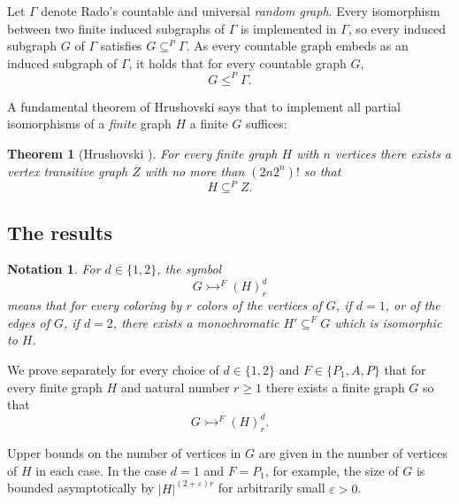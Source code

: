 \documentclass[11pt]{amsart}
\newcommand{\ars}{\rightarrowtail}
\newcommand{\su}{\subseteq}
\newtheorem*{notation}{Notation}
\newtheorem{theorem}{Theorem}[section]
\begin{document}
Let $\Gamma$ denote Rado's countable and universal \emph{random
  graph}. Every isomorphism between two finite induced subgraphs of
$\Gamma$ is implemented in $\Gamma$, so every induced subgraph
$G$
of $\Gamma$ satisfies $G\su ^P \Gamma$. As every
countable graph embeds as an induced subgraph of $\Gamma$,
it holds that for every countable graph $G$,
\begin{equation}G\le ^P \Gamma.
\end{equation}



A fundamental theorem of Hrushovski \cite{H} says  that to implement
all
partial isomorphisms of a \emph{finite} graph $H$  a finite $G$
suffices:

\begin{theorem}[Hrushovski \cite{H}]
For every finite graph $H$ with $n$ vertices there exists a vertex
transitive graph $Z$ with no more than $(2n2^n)!$ so that
\begin{equation}
H\su^P Z.
\end{equation}
\end{theorem}

\bigbreak

\subsection{The results}



\begin{notation}For $d\in \{1,2\}$,  the symbol
\[G\ars^F(H)^d_r\]
 means that for every coloring by $r$ colors of the vertices of $G$,
if
$d=1$, or of the edges of $G$, if $d=2$,
there exists a monochromatic $H'\su ^F G$ which is isomorphic
to $H$.
\end{notation}

We  prove separately for every  choice of $d\in\{1,2\}$ and
$F\in\{P_1, A, P\}$ that for every finite graph $H$ and natural
number $r\ge 1$ there exists a finite graph $G$ so that
\begin{equation}
G\ars^F (H)^d_r.
\end{equation}

Upper bounds on the number of vertices in $G$ are given  in the
number of vertices of $H$ in each case. In the case $d=1$ and
$F=P_1$, for example,  the size of $G$ is bounded asymptotically
by $|H|^{(2+\varepsilon)r}$ for arbitrarily small $\varepsilon>0$.
\end{document}
